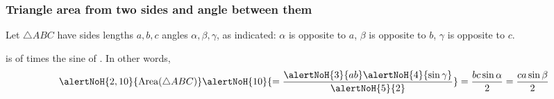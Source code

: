 \begin{frame}
\frametitle{Triangle area from two sides and angle between them}
Let $\triangle ABC$ have sides lengths $a,b,c$ angles $\alpha, \beta, \gamma$, as indicated: $\alpha$ is opposite to $a$, $\beta$ is opposite to $b$, $\gamma$ is opposite to $c$.

\begin{proposition}
 is  of  times the sine of . In other words, 
\[
\alertNoH{2,10}{ \text{Area}(\triangle ABC)} \alertNoH{10}{ =\frac{\alertNoH{3}{ a b } \alertNoH{4}{ \sin\gamma}}{\alertNoH{5}{2}}} = \frac{b c \sin \alpha }{2} = \frac{ca\sin\beta}{2}
\]
\end{proposition}


\end{frame}
